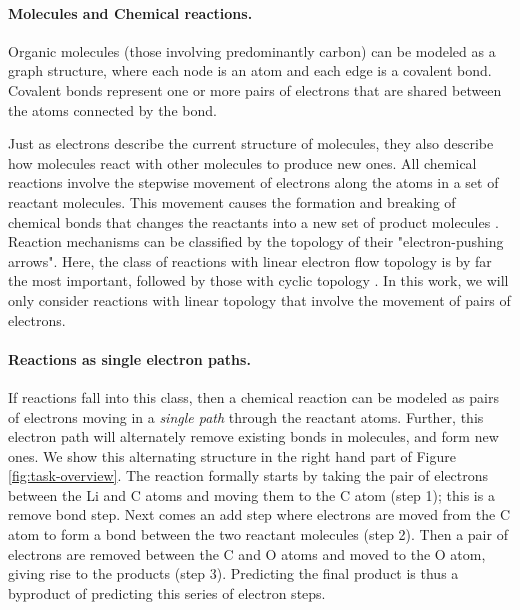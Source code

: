 \vspace{-0.15cm}
\paragraph{Molecules and Chemical reactions.}


Organic molecules (those involving predominantly carbon) can be modeled as a graph structure, where each node is an atom and each edge is a covalent bond.
Covalent bonds represent 
one or more pairs of electrons that are shared between the atoms connected by the bond. 


Just as electrons describe the current structure of molecules, 
they also describe how molecules react with other molecules to produce new ones. All chemical reactions involve the stepwise movement of electrons along the atoms in a set of reactant molecules. 
This movement causes the formation and breaking of chemical bonds that changes the reactants into a new set of product molecules \citep{herges1994coarctate}. 
%
Reaction mechanisms can be classified by the topology of their "electron-pushing arrows". Here, the class of reactions with linear electron flow topology is by far the most important, followed by those with cyclic topology \citep{herges1994coarctate}. In this work, we will only consider reactions with linear topology that involve the movement of pairs of electrons.


\paragraph{Reactions as single electron paths.}
If reactions fall into this class, then a chemical reaction can be modeled as pairs of electrons moving in a \emph{single path} through the reactant atoms. 
Further, this electron path will alternately remove existing bonds in molecules, and form new ones. We show this alternating structure in the right hand part of Figure \ref{fig:task-overview}. 
The reaction formally starts by taking the pair of electrons between the Li and C atoms and moving them to the C atom (step 1); this is a remove bond step. 
Next comes an add step where electrons are moved from the C atom to form a bond between the two reactant molecules (step 2).
Then a pair of electrons are removed between the C and O atoms and moved to the O atom, giving rise to the products (step 3). 
Predicting the final product is thus a byproduct of predicting this series of electron steps.




